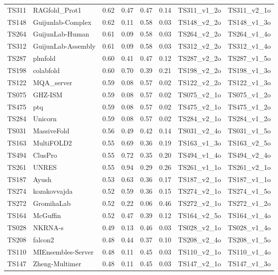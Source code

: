 \begin{longtable}{llllllll}
TS311 & RAGfold\_Prot1 & 0.62 & 0.47 & 0.47 & 0.14 & TS311\_v1\_2o & TS311\_v2\_1o \\ 
TS148 & Guijunlab-Complex & 0.62 & 0.11 & 0.58 & 0.03 & TS148\_v2\_2o & TS148\_v1\_3o \\ 
TS264 & GuijunLab-Human & 0.61 & 0.09 & 0.58 & 0.03 & TS264\_v2\_2o & TS264\_v1\_4o \\ 
TS312 & GuijunLab-Assembly & 0.61 & 0.09 & 0.58 & 0.03 & TS312\_v2\_2o & TS312\_v1\_4o \\ 
TS287 & plmfold & 0.60 & 0.41 & 0.47 & 0.12 & TS287\_v2\_2o & TS287\_v1\_5o \\ 
TS198 & colabfold & 0.60 & 0.70 & 0.39 & 0.21 & TS198\_v2\_2o & TS198\_v1\_3o \\ 
TS122 & MQA\_server & 0.59 & 0.08 & 0.57 & 0.02 & TS122\_v2\_2o & TS122\_v1\_3o \\ 
TS075 & GHZ-ISM & 0.59 & 0.08 & 0.57 & 0.02 & TS075\_v2\_1o & TS075\_v1\_2o \\ 
TS475 & ptq & 0.59 & 0.08 & 0.57 & 0.02 & TS475\_v2\_1o & TS475\_v1\_2o \\ 
TS284 & Unicorn & 0.59 & 0.08 & 0.57 & 0.02 & TS284\_v2\_1o & TS284\_v1\_2o \\ 
TS031 & MassiveFold & 0.56 & 0.49 & 0.42 & 0.14 & TS031\_v2\_4o & TS031\_v1\_5o \\ 
TS163 & MultiFOLD2 & 0.55 & 0.69 & 0.36 & 0.19 & TS163\_v1\_3o & TS163\_v2\_5o \\ 
TS494 & ClusPro & 0.55 & 0.72 & 0.35 & 0.20 & TS494\_v1\_4o & TS494\_v2\_4o \\ 
TS261 & UNRES & 0.55 & 0.94 & 0.29 & 0.26 & TS261\_v1\_1o & TS261\_v2\_1o \\ 
TS187 & Ayush & 0.53 & 0.63 & 0.36 & 0.17 & TS187\_v2\_1o & TS187\_v1\_1o \\ 
TS274 & kozakovvajda & 0.52 & 0.59 & 0.36 & 0.15 & TS274\_v2\_1o & TS274\_v1\_5o \\ 
TS272 & GromihaLab & 0.52 & 0.22 & 0.06 & 0.46 & TS272\_v2\_1o & TS272\_v1\_2o \\ 
TS164 & McGuffin & 0.52 & 0.47 & 0.39 & 0.12 & TS164\_v2\_5o & TS164\_v1\_4o \\ 
TS028 & NKRNA-s & 0.49 & 0.13 & 0.46 & 0.03 & TS028\_v2\_1o & TS028\_v1\_4o \\ 
TS208 & falcon2 & 0.48 & 0.44 & 0.37 & 0.10 & TS208\_v2\_4o & TS208\_v1\_5o \\ 
TS110 & MIEnsembles-Server & 0.48 & 0.11 & 0.45 & 0.03 & TS110\_v2\_1o & TS110\_v1\_4o \\ 
TS147 & Zheng-Multimer & 0.48 & 0.11 & 0.45 & 0.03 & TS147\_v2\_1o & TS147\_v1\_3o \\ 

\end{longtable}
